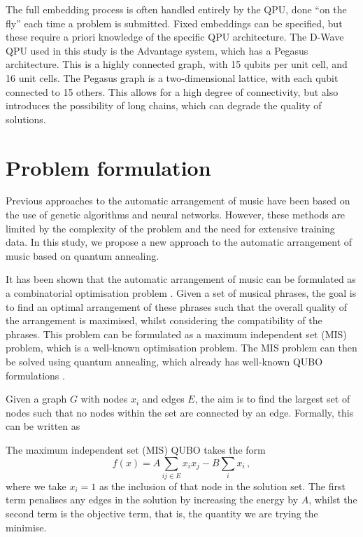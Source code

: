 \documentclass[aps,pra,10pt,twocolumn]{revtex4-2}
\begin{document}
The full embedding process is often handled entirely by the QPU, done ``on the fly'' each time a problem is submitted. Fixed embeddings can be specified, but these require a priori knowledge of the specific QPU architecture. The D-Wave QPU used in this study is the Advantage system, which has a Pegasus architecture. This is a highly connected graph, with 15 qubits per unit cell, and 16 unit cells. The Pegasus graph is a two-dimensional lattice, with each qubit connected to 15 others. This allows for a high degree of connectivity, but also introduces the possibility of long chains, which can degrade the quality of solutions.

\section{Problem formulation}

Previous approaches to the automatic arrangement of music have been based on the use of genetic algorithms and neural networks. However, these methods are limited by the complexity of the problem and the need for extensive training data. In this study, we propose a new approach to the automatic arrangement of music based on quantum annealing.

It has been shown that the automatic arrangement of music can be formulated as a combinatorial optimisation problem \cite{moses_computational_2016}. Given a set of musical phrases, the goal is to find an optimal arrangement of these phrases such that the overall quality of the arrangement is maximised, whilst considering the compatibility of the phrases. This problem can be formulated as a maximum independent set (MIS) problem, which is a well-known optimisation problem. The MIS problem can then be solved using quantum annealing, which already has well-known QUBO formulations \cite{lucas_ising_2014}.

Given a graph $G$ with nodes $x_i$ and edges $E$, the aim is to find the largest set of nodes such that no nodes within the set are connected by an edge. Formally, this can be written as

The maximum independent set (MIS) QUBO takes the form
\begin{equation}
    f(x)=A\sum_{ij\in E}x_ix_j-B\sum_i x_i\,,
    \label{eq:MIS}
\end{equation}
where we take $x_i=1$ as the inclusion of that node in the solution set. The first term penalises any edges in the solution by increasing the energy by $A$, whilst the second term is the objective term, that is, the quantity we are trying the minimise.
\end{document}
